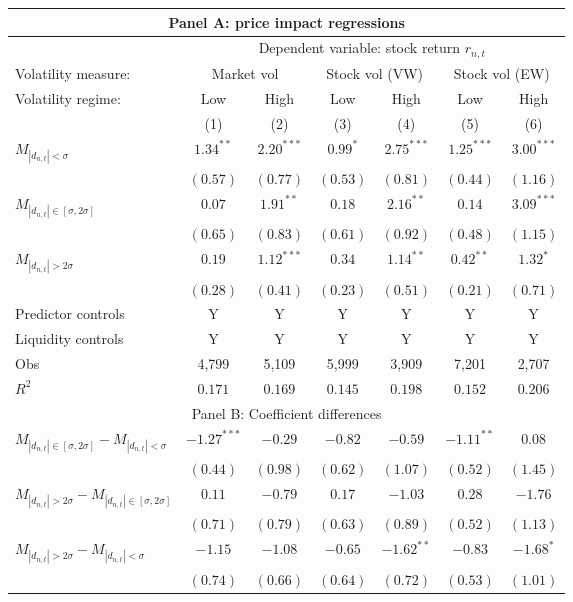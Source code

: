 \begin{tabular}{lcccccc}
  \hline \multicolumn{7}{c}{Panel A: price impact regressions} \\
 \hline
                                    & \multicolumn{6}{c}{Dependent variable: stock return $r_{n,t}$} \\

                                    \cmidrule(l){2-7} Volatility measure: & \multicolumn{2}{c}{Market vol} & \multicolumn{2}{c}{Stock vol (VW)} & \multicolumn{2}{c}{Stock vol (EW)} \\
 \cmidrule(l){2-3} \cmidrule(l){4-5} \cmidrule(l){6-7} Volatility regime: & Low & High & Low & High & Low & High \\
 \cmidrule(l){2-3} \cmidrule(l){4-5} \cmidrule(l){6-7} 
  & (1) & (2) & (3) & (4) & (5) & (6) \\ 
  $M_{|d_{n,t}| < \sigma}$ & $1.34^{**}$ & $2.20^{***}$ & $0.99^{*}$ & $2.75^{***}$ & $1.25^{***}$ & $3.00^{***}$ \\ 
   & $(0.57)$ & $(0.77)$ & $(0.53)$ & $(0.81)$ & $(0.44)$ & $(1.16)$ \\ 
  $M_{|d_{n,t}| \in [\sigma, 2\sigma]}$ & $0.07$ & $1.91^{**}$ & $0.18$ & $2.16^{**}$ & $0.14$ & $3.09^{***}$ \\ 
   & $(0.65)$ & $(0.83)$ & $(0.61)$ & $(0.92)$ & $(0.48)$ & $(1.15)$ \\ 
  $M_{|d_{n,t}| > 2 \sigma}$ & $0.19$ & $1.12^{***}$ & $0.34$ & $1.14^{**}$ & $0.42^{**}$ & $1.32^{*}$ \\ 
   \vspace{5pt} & $(0.28)$ & $(0.41)$ & $(0.23)$ & $(0.51)$ & $(0.21)$ & $(0.71)$ \\ 
  Predictor controls & Y & Y & Y & Y & Y & Y \\ 
   \vspace{5pt}Liquidity controls & Y & Y & Y & Y & Y & Y \\ 
  Obs & 4,799 & 5,109 & 5,999 & 3,909 & 7,201 & 2,707 \\ 
  $R^2$ & $0.171$ & $0.169$ & $0.145$ & $0.198$ & $0.152$ & $0.206$ \\ 
   \hline \multicolumn{7}{c}{Panel B: Coefficient differences} \\
 \hline$M_{|d_{n,t}| \in [\sigma, 2\sigma]} - M_{|d_{n,t}| < \sigma}$ & $-1.27^{***}$ & $-0.29$ & $-0.82$ & $-0.59$ & $-1.11^{**}$ & $0.08$ \\ 
   & $(0.44)$ & $(0.98)$ & $(0.62)$ & $(1.07)$ & $(0.52)$ & $(1.45)$ \\ 
  $M_{|d_{n,t}| > 2 \sigma} - M_{|d_{n,t}| \in [\sigma, 2\sigma]}$ & $0.11$ & $-0.79$ & $0.17$ & $-1.03$ & $0.28$ & $-1.76$ \\ 
   & $(0.71)$ & $(0.79)$ & $(0.63)$ & $(0.89)$ & $(0.52)$ & $(1.13)$ \\ 
  $M_{|d_{n,t}| > 2 \sigma} - M_{|d_{n,t}| < \sigma}$ & $-1.15$ & $-1.08$ & $-0.65$ & $-1.62^{**}$ & $-0.83$ & $-1.68^{*}$ \\ 
   & $(0.74)$ & $(0.66)$ & $(0.64)$ & $(0.72)$ & $(0.53)$ & $(1.01)$ \\ 
   \hline 
\end{tabular}
